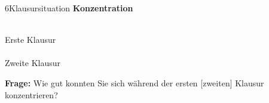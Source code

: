 \documentclass[xcolor=table,9pt,aspectratio=169]{beamer}
\begin{document}
\begin{frame}{\vspace*{10mm}6\hspace*{1em}Klausursituation}
\textbf{Konzentration}\\
\begin{multicols}{2}
   \begin{center}
      \\Erste Klausur\\
      \\Zweite Klausur\\
   \end{center}
\end{multicols}
\textbf{Frage:} Wie gut konnten Sie sich während der ersten [zweiten] Klausur konzentrieren?
\end{frame}
\end{document}
